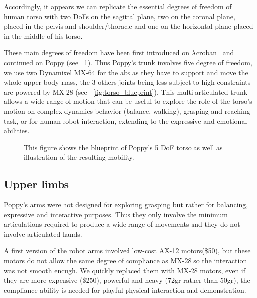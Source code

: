 Accordingly, it appears we can replicate the essential degrees of freedom of human torso with two DoFs on the sagittal plane, two on the coronal plane, placed in the pelvis and shoulder/thoracic and one on the horizontal plane placed in the middle of his torso.

These main degrees of freedom have been first introduced on Acroban~\parencite{ly2011bio} and continued on Poppy (see \figurename~\ref{fig:poppy_torso}).
Thus Poppy's trunk involves five degree of freedom, we use two Dynamixel MX-64 for the abs as they have to support and move the whole upper body mass, the 3 others joints being less subject to high constraints are powered by MX-28 (see \figurename~\ref{fig:torso_blueprint}). This multi-articulated trunk allows a wide range of motion that can be useful to explore the role of the torso’s motion on complex dynamics behavior (balance, walking), grasping and reaching task, or for human-robot interaction, extending to the expressive and emotional abilities.

\begin{figure}[p]
\centering


    \hfill
    \caption{This figure shows the blueprint of Poppy's 5 DoF torso as well as illustration of the resulting mobility.}
    \label{fig:poppy_torso}
\end{figure}



\subsection{Upper limbs} %

Poppy's arms were not designed for exploring grasping but rather for balancing, expressive and interactive purposes. Thus they only involve the minimum articulations required to produce a wide range of movements and they do not involve articulated hands.

A first version of the robot arms involved low-cost AX-12 motors(\$50), but these motors do not allow the same degree of compliance as MX-28 so the interaction was not smooth enough. We quickly replaced them with MX-28 motors, even if they are more expensive (\$250), powerful and heavy (72gr rather than 50gr), the compliance ability is needed for playful physical interaction and demonstration.

